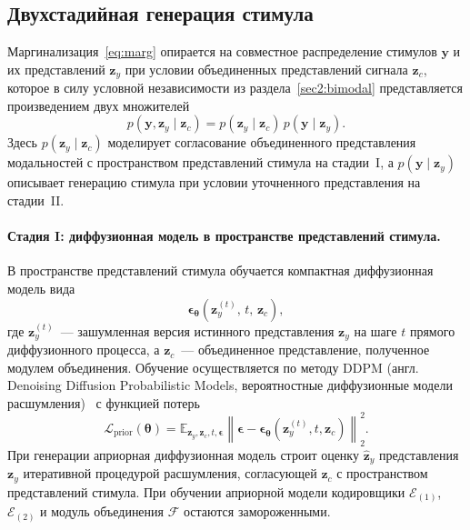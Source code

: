 \subsection{Двухстадийная генерация стимула}\label{sec3:gen}

Маргинализация~\eqref{eq:marg} опирается на совместное распределение стимулов $\mathbf{y}$ и их представлений $\mathbf{z}_y$ при условии объединенных представлений сигнала $\mathbf{z}_c$, которое в силу условной независимости из раздела~\ref{sec2:bimodal} представляется произведением двух множителей
\begin{equation*}
p(\mathbf{y}, \mathbf{z}_y \mid \mathbf{z}_c) = p(\mathbf{z}_y \mid \mathbf{z}_c)\, p(\mathbf{y} \mid \mathbf{z}_y).
\end{equation*}
Здесь $p(\mathbf{z}_y \mid \mathbf{z}_c)$ моделирует согласование объединенного представления модальностей с пространством представлений стимула на стадии~I, а $p(\mathbf{y} \mid \mathbf{z}_y)$ описывает генерацию стимула при условии уточненного представления на стадии~II.

\paragraph{Стадия I: диффузионная модель в пространстве представлений стимула.}
В пространстве представлений стимула обучается компактная диффузионная модель вида
\begin{equation*}
\boldsymbol{\epsilon}_{\boldsymbol{\theta}}(\mathbf{z}_y^{(t)},\, t,\, \mathbf{z}_c),
\end{equation*}
где $\mathbf{z}_y^{(t)}$~--- зашумленная версия истинного представления $\mathbf{z}_y$ на шаге $t$ прямого диффузионного процесса, а $\mathbf{z}_c$~--- объединенное представление, полученное модулем объединения. Обучение осуществляется по методу DDPM (англ. Denoising Diffusion Probabilistic Models, вероятностные диффузионные модели расшумления)~\cite{ho2020denoisingdiffusionprobabilisticmodels} с функцией потерь
\begin{equation}\label{eq:prior_loss}
\mathcal{L}_{\text{prior}}(\boldsymbol{\theta}) = \mathbb{E}_{\mathbf{z}_y, \mathbf{z}_c, t, \boldsymbol{\epsilon}} \left\| \boldsymbol{\epsilon} - \boldsymbol{\epsilon}_{\boldsymbol{\theta}}(\mathbf{z}_y^{(t)}, t, \mathbf{z}_c)\right\|_2^2.
\end{equation}
При генерации априорная диффузионная модель строит оценку $\widehat{\mathbf{z}}_y$ представления $\mathbf{z}_y$ итеративной процедурой расшумления, согласующей $\mathbf{z}_c$ с пространством представлений стимула. При обучении априорной модели кодировщики $\mathcal{E}_{(1)}$, $\mathcal{E}_{(2)}$ и модуль объединения $\mathcal{F}$ остаются замороженными.

